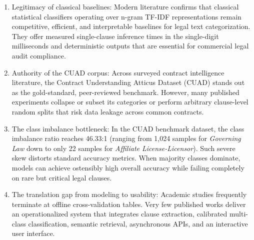 \begin{enumerate}
    \item Legitimacy of classical baselines: Modern literature confirms that classical statistical classifiers operating over n-gram TF-IDF representations remain competitive, efficient, and interpretable baselines for legal text categorization. They offer measured single-clause inference times in the single-digit milliseconds and deterministic outputs that are essential for commercial legal audit compliance.
    \item Authority of the CUAD corpus: Across surveyed contract intelligence literature, the Contract Understanding Atticus Dataset (CUAD) stands out as the gold-standard, peer-reviewed benchmark. However, many published experiments collapse or subset its \NumClasses{} categories or perform arbitrary clause-level random splits that risk data leakage across common contracts.
    \item The class imbalance bottleneck: In the CUAD benchmark dataset, the class imbalance ratio reaches 46.33:1 (ranging from 1,024 samples for \textit{Governing Law} down to only 22 samples for \textit{Affiliate License-Licensor}). Such severe skew distorts standard accuracy metrics. When majority classes dominate, models can achieve ostensibly high overall accuracy while failing completely on rare but critical legal clauses.
    \item The translation gap from modeling to usability: Academic studies frequently terminate at offline cross-validation tables. Very few published works deliver an operationalized system that integrates clause extraction, calibrated multi-class classification, semantic retrieval, asynchronous APIs, and an interactive user interface.
\end{enumerate}
